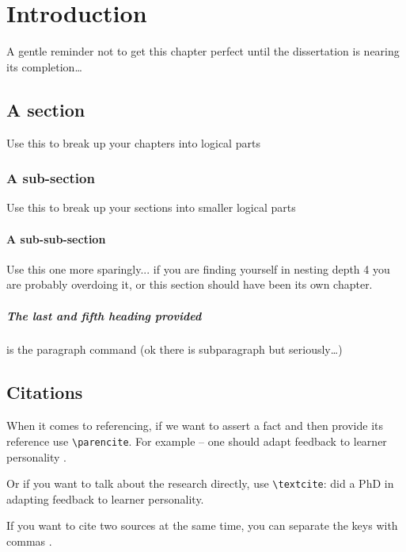 \chapter{Introduction}
\label{chap:intro}
A gentle reminder not to get this chapter perfect until the dissertation is nearing its completion\ldots

\section{A section}
\label{intro:sections}

Use this to break up your chapters into logical parts

\subsection{A sub-section}

Use this to break up your sections into smaller logical parts

\subsubsection{A sub-sub-section}

Use this one more sparingly... if you are finding yourself in nesting depth 4 you are probably overdoing it, or this section should have been its own chapter.

\paragraph{The last and fifth heading provided} is the paragraph command (ok there is subparagraph but seriously\ldots)

\section{Citations}
\label{intro:citations}

When it comes to referencing, if we want to assert a fact and then provide its reference use \verb!\parencite!. For example -- one should adapt feedback to learner personality \parencite{dennis2016adapting}.

Or if you want to talk about the research directly, use \verb!\textcite!: \textcite{dennis2016adapting} did a PhD in adapting feedback to learner personality. 

If you want to cite two sources at the same time, you can separate the keys with commas \parencite{dennis2016adapting,cle12}.

